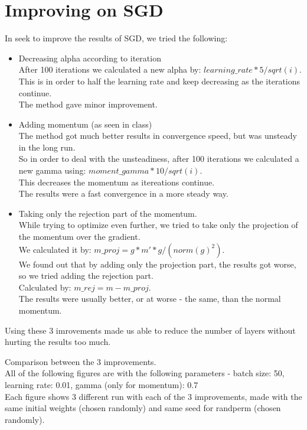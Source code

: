 \documentclass{article}
\numberwithin{equation}{section}
\begin{document}
\newpage

\section{Improving on SGD}
In seek to improve the results of SGD, we tried the following:
\begin{itemize}
 \item 
 Decreasing alpha according to iteration\\
 After 100 iterations we calculated a new alpha by: $learning{\_}rate * 5 / sqrt(i)$.\\
 This is in order to half the learning rate and keep decreasing as the iterations continue.\\
 The method gave minor improvement.
 \item
 Adding momentum (as seen in class)\\
 The method got much better results in convergence speed, but was unsteady in the long run.\\
 So in order to deal with the unsteadiness, after 100 iterations we calculated a new gamma using: $moment{\_}gamma * 10 / sqrt(i)$.\\
 This decreases the momentum as itereations continue.\\
 The results were a fast convergence in a more steady way.
 \item
 Taking only the rejection part of the momentum.\\
 While trying to optimize even further, we tried to take only the projection of the momentum over the gradient.\\
 We calculated it by: $m{\_}proj = g * m' * g / (norm(g)^2)$.\\
 We found out that by adding only the projection part, the results got worse, so we tried adding the rejection part.\\
 Calculated by: $m{\_}rej = m - m{\_}proj$.\\
 The results were usually better, or at worse - the same, than the normal momentum.
\end{itemize}

Using these 3 imrovements made us able to reduce the number of layers without hurting the results too much.

\newpage

Comparison between the 3 improvements.\\

All of the following figures are with the following parameters - batch size: 50, learning rate: 0.01, gamma (only for momentum): 0.7\\
Each figure shows 3 different run with each of the 3 improvements, made with the same initial weights (chosen randomly) and same seed for randperm (chosen randomly).\\
\end{document}

